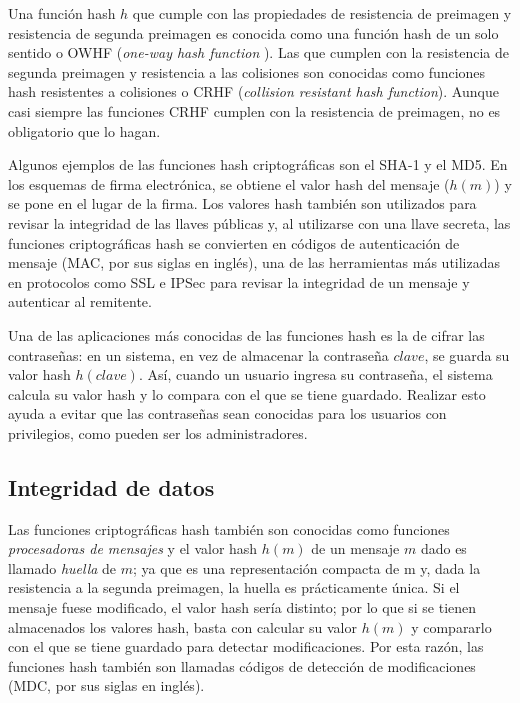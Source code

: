 Una función hash $h$ que cumple con las propiedades de resistencia de
preimagen y resistencia de segunda preimagen es conocida como una
función hash de un solo sentido o OWHF (\textit{one-way hash function}
). Las que cumplen con la resistencia de segunda preimagen y
resistencia a las colisiones son conocidas como funciones hash
resistentes a colisiones o CRHF
(\textit{collision resistant hash function}). Aunque casi siempre las
funciones CRHF cumplen con la resistencia de preimagen, no es
obligatorio que lo hagan.

Algunos ejemplos de las funciones hash criptográficas son el SHA-1 y el
MD5. En los esquemas de firma electrónica, se obtiene el valor hash del
mensaje ($h(m)$) y se pone en el lugar de la firma. Los valores hash
también son utilizados para revisar la integridad de las llaves
públicas y, al utilizarse con una llave secreta, las funciones
criptográficas hash se convierten en códigos de autenticación de
mensaje (MAC, por sus siglas en inglés), una de las herramientas más
utilizadas en protocolos como SSL e IPSec para revisar la integridad de
un mensaje y autenticar al remitente.

Una de las aplicaciones más conocidas de las funciones hash es la de
cifrar las contraseñas: en un sistema, en vez de almacenar la contraseña
$clave$, se guarda su valor hash $h(clave)$. Así, cuando un usuario
ingresa su contraseña, el sistema calcula su valor hash y lo compara con
el que se tiene guardado. Realizar esto ayuda a evitar que las
contraseñas sean conocidas para los usuarios con privilegios, como
pueden ser los administradores.

\subsection{Integridad de datos}
Las funciones criptográficas hash también son conocidas como funciones
\textit{procesadoras de mensajes} y el valor hash $h(m)$ de un mensaje
$m$ dado es llamado \textit{huella} de $m$; ya que es una representación
compacta de m y, dada la resistencia a la segunda preimagen, la huella
es prácticamente única. Si el mensaje fuese modificado, el valor hash
sería distinto; por lo que si se tienen almacenados los valores hash,
basta con calcular su valor $h(m)$ y compararlo con el que se tiene
guardado para detectar modificaciones. Por esta razón, las funciones
hash también son llamadas códigos de detección de modificaciones (MDC,
por sus siglas en inglés).

